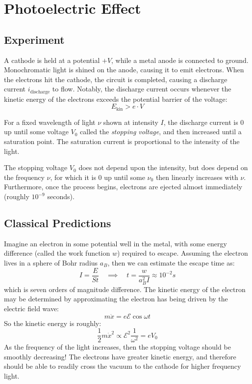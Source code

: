 \documentclass{article}
\begin{document}
\tableofcontents
\pagebreak

\section{Photoelectric Effect}

\subsection{Experiment}
A cathode is held at a potential $+V$, while a metal anode is connected to ground.
Monochromatic light is shined on the anode, causing it to emit electrons. When the
electrons hit the cathode, the circuit is completed, causing a discharge current 
$i_{\text{discharge}}$ to flow. Notably, the discharge current occurs whenever
the kinetic energy of the electrons exceeds the potential barrier of the voltage:
\begin{equation*}
	E_{\text{kin}} > e \cdot V
\end{equation*}

For a fixed wavelength of light $\nu$ shown at intensity $I$, the discharge current
is 0 up until some voltage $V_0$ called the \emph{stopping voltage}, and then increased
until a saturation point. The saturation current is proportional to the intensity of
the light.

The stopping voltage $V_0$ does not depend upon the intensity, but does depend on
the frequency $\nu$, for which it is 0 up until some $\nu_0$ then linearly increases
with $\nu$. Furthermore, once the process begins, electrons are ejected almost
immediately (roughly $10^{-9}$ seconds). 

\subsection{Classical Predictions}
Imagine an electron in some potential well in the metal, with some energy difference
(called the work function $w$) required to escape. Assuming the electron lives in
a sphere of Bohr radius $a_B$, then we can estimate the escape time as:
\begin{equation*}
	I = \frac{E}{St} \quad \implies \quad t = \frac{w}{a_B^2 I} \approx 10^{-2} s
\end{equation*}
which is seven orders of magnitude difference. The kinetic energy of the electron
may be determined by approximating the electron has being driven by the electric
field wave:
\begin{equation*}
	m \ddot{x} = e \mathcal{E} \cos \omega t
\end{equation*}
So the kinetic energy is roughly:
\begin{equation*}
	\frac{1}{2} m \dot{x}^2 \propto \mathcal{E}^2 \frac{1}{\omega^2} = eV_0
\end{equation*}
As the frequency of the light increases, then the stopping voltage should be smoothly
decreasing! The electrons have greater kinetic energy, and therefore should be able
to readily cross the vacuum to the cathode for higher frequency light.
\end{document}
